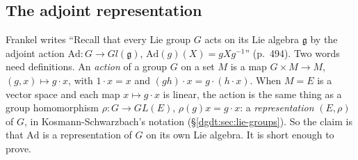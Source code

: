 \subsection{The adjoint representation}\label{quat:sec:adjoint}
Frankel writes ``Recall that every Lie group $G$ acts on its Lie algebra
$\mathfrak g$ by the adjoint action $\mathrm{Ad}\colon G\to Gl(\mathfrak g)$,
$\mathrm{Ad}(g)(X)=gXg^{-1}$'' (p.~494). Two words need definitions.
An \emph{action} of a group $G$ on a set $M$ is a map
$G\times M\to M$, $(g,x)\mapsto g\cdot x$, with $1\cdot x=x$ and
$(gh)\cdot x=g\cdot(h\cdot x)$. When $M=E$ is a vector space and each map
$x\mapsto g\cdot x$ is linear, the action is the same thing as a group
homomorphism $\rho\colon G\to GL(E)$, $\rho(g)x=g\cdot x$: a
\emph{representation} $(E,\rho)$ of $G$, in Kosmann-Schwarzbach's notation
(\S\ref{dgdt:sec:lie-groups}). So the claim is that $\mathrm{Ad}$ is a
representation of $G$ on its own Lie algebra. It is short enough to prove.

